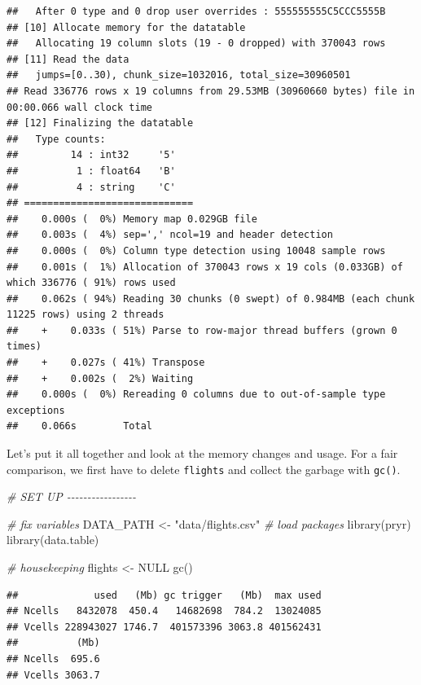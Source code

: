 \documentclass[
  12pt,
]{style/krantz}
\newenvironment{Shaded}{\begin{snugshade}}{\end{snugshade}}
\newcommand{\CommentTok}[1]{\textcolor[rgb]{0.56,0.35,0.01}{\textit{#1}}}
\newcommand{\ConstantTok}[1]{\textcolor[rgb]{0.00,0.00,0.00}{#1}}
\newcommand{\FunctionTok}[1]{\textcolor[rgb]{0.00,0.00,0.00}{#1}}
\newcommand{\NormalTok}[1]{#1}
\newcommand{\OtherTok}[1]{\textcolor[rgb]{0.56,0.35,0.01}{#1}}
\newcommand{\StringTok}[1]{\textcolor[rgb]{0.31,0.60,0.02}{#1}}
\begin{document}
\begin{verbatim}
##   After 0 type and 0 drop user overrides : 555555555C5CCC5555B
## [10] Allocate memory for the datatable
##   Allocating 19 column slots (19 - 0 dropped) with 370043 rows
## [11] Read the data
##   jumps=[0..30), chunk_size=1032016, total_size=30960501
## Read 336776 rows x 19 columns from 29.53MB (30960660 bytes) file in 00:00.066 wall clock time
## [12] Finalizing the datatable
##   Type counts:
##         14 : int32     '5'
##          1 : float64   'B'
##          4 : string    'C'
## =============================
##    0.000s (  0%) Memory map 0.029GB file
##    0.003s (  4%) sep=',' ncol=19 and header detection
##    0.000s (  0%) Column type detection using 10048 sample rows
##    0.001s (  1%) Allocation of 370043 rows x 19 cols (0.033GB) of which 336776 ( 91%) rows used
##    0.062s ( 94%) Reading 30 chunks (0 swept) of 0.984MB (each chunk 11225 rows) using 2 threads
##    +    0.033s ( 51%) Parse to row-major thread buffers (grown 0 times)
##    +    0.027s ( 41%) Transpose
##    +    0.002s (  2%) Waiting
##    0.000s (  0%) Rereading 0 columns due to out-of-sample type exceptions
##    0.066s        Total
\end{verbatim}

Let's put it all together and look at the memory changes and usage. For a fair comparison, we first have to delete \texttt{flights} and collect the garbage with \texttt{gc()}.

\begin{Shaded}
\begin{Highlighting}[]
\CommentTok{\# SET UP {-}{-}{-}{-}{-}{-}{-}{-}{-}{-}{-}{-}{-}{-}{-}{-}{-}}

\CommentTok{\# fix variables}
\NormalTok{DATA\_PATH }\OtherTok{\textless{}{-}} \StringTok{"data/flights.csv"}
\CommentTok{\# load packages}
\FunctionTok{library}\NormalTok{(pryr) }
\FunctionTok{library}\NormalTok{(data.table)}

\CommentTok{\# housekeeping}
\NormalTok{flights }\OtherTok{\textless{}{-}} \ConstantTok{NULL}
\FunctionTok{gc}\NormalTok{()}
\end{Highlighting}
\end{Shaded}

\begin{verbatim}
##             used   (Mb) gc trigger   (Mb)  max used
## Ncells   8432078  450.4   14682698  784.2  13024085
## Vcells 228943027 1746.7  401573396 3063.8 401562431
##          (Mb)
## Ncells  695.6
## Vcells 3063.7
\end{verbatim}
\end{document}
